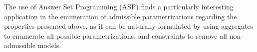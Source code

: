 The use of Answer Set Programming (ASP) finds a particularly interesting application in the enumeration of admissible parametrizations regarding the properties presented above, as it can be naturally formulated by using aggregates to enumerate all possible parametrizations, and constraints to remove all non-admissible models.



\begin{comment}
\subsection{Answer Set Programming implementation concepts}

\newcommand{\ti}[1]{\texttt{\textit{#1}}}
\newcommand{\aspil}[1]{\texttt{#1}}
\newcommand{\asp}[1]{\begin{itemize} \item[] \aspil{#1} \end{itemize}}


All information describing the studied model (PH and inferred IG \& parameters) can be expressed in ASP using facts.
For functional purposes, we assign a unique label to each couple $A,B$ of activators and inhibitors of a given component, which allows to refer to the related parameter (in the following, we note $K^p_{a,A,B}$ the parameter of component $a$ whose regulators $A,B$ are assigned to the label $p$).
Consequently, to express that it exists a parameter of component \ti{a} with the label \ti{p}, we use an atom named \aspil{param\_label} in the following fact:
\asp{param\_label(\ti{a}, \ti{p}).}

Defining a set in ASP is equivalent to defining the rule for belonging to this set. For example, we can define an atom \aspil{param\_act} that describes the set of all active regulators for a parameter of component \ti{a} and label \ti{p} (\ie the set $A$ of a parameter $K^\ti{p}_{\ti{a},A,B}$). For example, describing the activators of $K^\ti{p}_{\ti{a},\{\ti{b},\ti{c}\},\{\ti{d}\}}$ gives:
\asp{param\_act(\ti{a}, \ti{p}, \ti{b}).
\item[] param\_act(\ti{a}, \ti{p}, \ti{c}).}
The absence of such a fact involving \ti{d} with label \ti{p} indicates that \ti{d} is an inhibitor in the configuration of regulators related to this parameter.

Rules allow more detailed declarations than facts as they have a body (right-hand part below) containing constraints and allowing to use variables, while facts only have a head (left-hand part).
For instance, in order to define the set of expression levels of a component, we can declare:
\asp{component\_levels(X, 0..M) :- component(X, M).}
where the \aspil{component(X, M)} atom stands for the existence of a component \aspil{X} with a maximum level \aspil{M}.
Considering this declaration, any possible answer for the atom \aspil{component\_levels} will be found by binding all possible values of its terms with all existing \aspil{component} facts: an answer \aspil{component\_levels(\ti{a}, \ti{k})} will depend on the existence of a term \ti{a}, which is bound with \aspil{X}, and an integer~\ti{k}, constrained by: $0 \leq \ti{k} \leq \aspil{M}$.


\end{comment}
